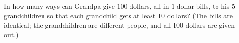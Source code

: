 In how many ways can Grandpa give $100$ dollars, all in $1$-dollar bills, to his $5$ grandchildren so that each grandchild gets at least $10$ dollars? (The bills are identical; the grandchildren are different people, and all $100$ dollars are given out.)
